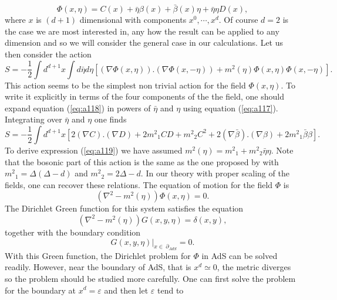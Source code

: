 \documentclass[a4paper,11pt]{article}
\begin{document}
\begin{equation}\label{eq:a117}
\Phi(x,\eta)=C(x)+\bar{\eta}\beta(x)+\bar{\beta}(x)\eta+
\bar{\eta}\eta D(x),
\end{equation}
where $x$ is $(d+1)$ dimensional with components $x^0,\cdots,x^d$.
Of course $d=2$ is the case we are most interested in, any how the
result can be applied to any dimension and so we will consider
the general case in our calculations. Let us then consider the
action
\begin{equation}\label{eq:a118}
S=-\frac 12\int d^{d+1}x\int d\bar{\eta} d\eta [(\nabla \Phi
(x,\eta )).(\nabla \Phi (x,-\eta ))+ m^2(\eta )\Phi(x,\eta )\Phi
(x,-\eta )].
\end{equation}
This action seems to be the simplest non trivial action for the
field $\Phi (x,\eta ).$ To write it explicitly in terms of the
four components of the the field, one should expand equation
(\ref{eq:a118}) in powers of $\bar{\eta}$ and $\eta$ using
equation (\ref{eq:a117}). Integrating over $\bar{\eta}$ and $\eta$
one finds
\begin{equation}  \label{eq:a119}
S=-\frac{1}{2}\int d^{d+1} x [2(\nabla C).(\nabla D)+ 2{m^2}_1CD
+{m^2}_2 C^2 + 2(\nabla\bar{\beta}).(\nabla\beta)+2{m^2}_1
\bar{\beta}\beta].
\end{equation}
To derive expression (\ref{eq:a119}) we have assumed
$m^2(\eta)={m^2}_1 +{m^2}_2 \bar{\eta} \eta$. Note that the
bosonic part of this action is the same as the one proposed by
\cite{khor,iko} with ${m^2}_1=\Delta(\Delta-d)$ and ${
m^2}_2=2\Delta-d$. In our theory with proper scaling of the
fields, one can recover these relations. The equation of motion
for the field $\Phi$ is
\begin{equation}  \label{eq:a120}
({\nabla}^2 - m^2(\eta))\Phi(x,\eta)=0.
\end{equation}
The Dirichlet Green function for this system satisfies the
equation
\begin{equation}  \label{eq:a121}
({\nabla}^2 - m^2(\eta))G(x,y,\eta)=\delta(x,y),
\end{equation}
together with the boundary condition
\begin{equation}  \label{eq:a122}
G(x,y,\eta)|_{x\in \:\partial_{AdS}} =0.
\end{equation}
With this Green function, the Dirichlet problem for $\Phi$ in AdS
can be solved readily. However, near the boundary of AdS, that is
$x^d \simeq 0$,  the metric diverges so the problem should be
studied more carefully. One can first solve the problem for the
boundary at $x^d=\varepsilon$ and then let $\varepsilon$ tend to
\end{document}
